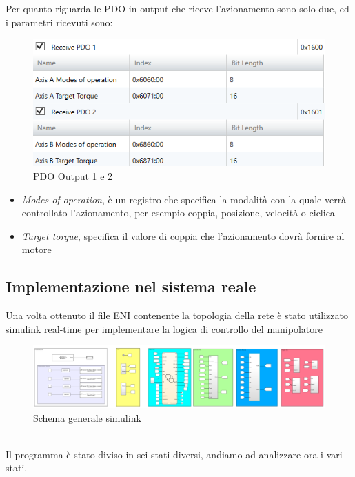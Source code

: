 Per quanto riguarda le PDO in output che riceve l'azionamento sono solo due, ed i parametri ricevuti sono:
\begin{figure}[ht]
	\begin{center}
		\includegraphics[scale=0.6]{Immagini/Sperimentale/pdo12out.png}
		\caption{PDO Output 1 e 2}
		\label{fig:PDOOut}
	\end{center}
\end{figure}
\begin{itemize}
	\item \textit{Modes of operation}, è un registro che specifica la modalità con la quale verrà controllato l'azionamento, per esempio coppia, posizione, velocità o ciclica
	\item \textit{Target torque}, specifica il valore di coppia che l'azionamento dovrà fornire al motore
\end{itemize}
\subsection{Implementazione nel sistema reale}
Una volta ottenuto il file ENI contenente la topologia della rete è stato utilizzato simulink real-time per implementare la logica di controllo del manipolatore
\begin{figure}[ht]
	\begin{center}
		\includegraphics[scale=0.5]{Immagini/Sperimentale/generalSchema}
		\caption{Schema generale simulink}
		\label{fig:SimulinkSchema}
	\end{center}
\end{figure}
\\Il programma è stato diviso in sei stati diversi, andiamo ad analizzare ora i vari stati.
